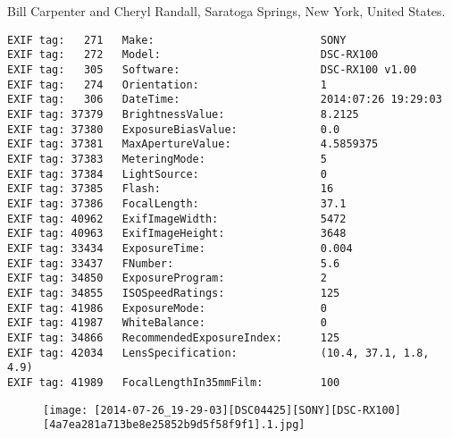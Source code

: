 \section{\protect{}}
\noindent Bill Carpenter and Cheryl Randall, Saratoga Springs, New York, United States.
\noindent
\begin{lstlisting}
EXIF tag:   271   Make:                          SONY
EXIF tag:   272   Model:                         DSC-RX100
EXIF tag:   305   Software:                      DSC-RX100 v1.00
EXIF tag:   274   Orientation:                   1
EXIF tag:   306   DateTime:                      2014:07:26 19:29:03
EXIF tag: 37379   BrightnessValue:               8.2125
EXIF tag: 37380   ExposureBiasValue:             0.0
EXIF tag: 37381   MaxApertureValue:              4.5859375
EXIF tag: 37383   MeteringMode:                  5
EXIF tag: 37384   LightSource:                   0
EXIF tag: 37385   Flash:                         16
EXIF tag: 37386   FocalLength:                   37.1
EXIF tag: 40962   ExifImageWidth:                5472
EXIF tag: 40963   ExifImageHeight:               3648
EXIF tag: 33434   ExposureTime:                  0.004
EXIF tag: 33437   FNumber:                       5.6
EXIF tag: 34850   ExposureProgram:               2
EXIF tag: 34855   ISOSpeedRatings:               125
EXIF tag: 41986   ExposureMode:                  0
EXIF tag: 41987   WhiteBalance:                  0
EXIF tag: 34866   RecommendedExposureIndex:      125
EXIF tag: 42034   LensSpecification:             (10.4, 37.1, 1.8, 4.9)
EXIF tag: 41989   FocalLengthIn35mmFilm:         100

\end{lstlisting}
\clearpage
\begin{figure}
\raggedleft
\texttt{[image: [2014-07-26\_19-29-03][DSC04425][SONY][DSC-RX100][4a7ea281a713be8e25852b9d5f58f9f1].1.jpg]}
\end{figure}


\clearpage
